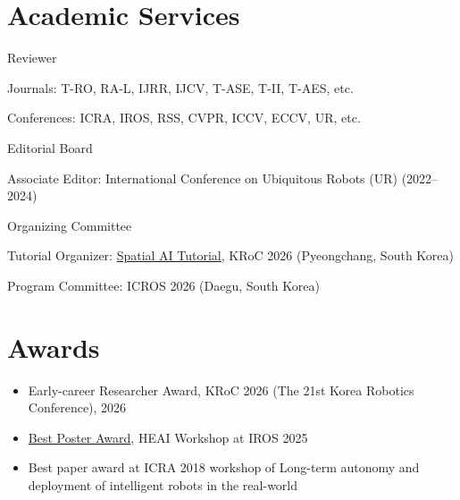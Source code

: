\documentclass{cv} %
\begin{document}
\section{Academic Services}

\begin{pubSubsection}{Reviewer}
    \item Journals: T-RO, RA-L, IJRR, IJCV, T-ASE, T-II, T-AES, etc.
    \vspace{-1mm}
    \item Conferences: ICRA, IROS, RSS, CVPR, ICCV, ECCV, UR, etc.
\end{pubSubsection}

\vspace{-2mm}
\begin{pubSubsectionNum}{Editorial Board}
    \item Associate Editor: International Conference on Ubiquitous Robots (UR) (2022--2024)
\end{pubSubsectionNum}

\vspace{-2mm}
\begin{pubSubsectionNum}{Organizing Committee}
    \item Tutorial Organizer: \href{}{Spatial AI Tutorial}, KRoC 2026 (Pyeongchang, South Korea)
    \vspace{-1mm}
    \item Program Committee: ICROS 2026 (Daegu, South Korea)
\end{pubSubsectionNum}

\section{Awards}

\begin{itemize}[label=$\cdot$]
    \item Early-career Researcher Award, KRoC 2026 (The 21st Korea Robotics Conference), 2026
    \vspace{-1mm}
    \item \href{}{Best Poster Award}, HEAI Workshop at IROS 2025
    \vspace{-1mm}
    \item Best paper award at ICRA 2018 workshop of Long-term autonomy and deployment of intelligent robots in the real-world
\end{itemize}
\end{document}
